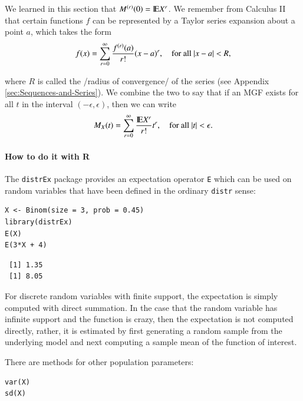 \documentclass[captions=tableheading]{scrbook}
\begin{document}
\begin{rem}
We learned in this section that \(M^{(r)}(0)=\mathrm{I\hspace{-1.5pt}E} X^{r}\). We remember from Calculus II that certain functions \(f\) can be represented by a Taylor series expansion about a point \(a\), which takes the form
\begin{equation}
f(x)=\sum_{r=0}^{\infty}\frac{f^{(r)}(a)}{r!}(x-a)^{r},\quad\mbox{for all \ensuremath{|x-a|<R},}
\end{equation}

where \(R\) is called the /radius of convergence/ of the series (see Appendix \ref{sec:Sequences-and-Series}). We combine the two to say that if an MGF exists for all \(t\) in the interval \((-\epsilon,\epsilon)\), then we can write
\begin{equation}
M_{X}(t)=\sum_{r=0}^{\infty}\frac{\mathrm{I\hspace{-1.5pt}E} X^{r}}{r!}t^{r},\quad\mbox{for all \ensuremath{|t|<\epsilon}.}
\end{equation}

\end{rem}

\paragraph*{How to do it with \textsf{R}}

The \texttt{distrEx} package provides an expectation operator \texttt{E} which can be used on random variables that have been defined in the ordinary \texttt{distr} sense:


\begin{verbatim}
X <- Binom(size = 3, prob = 0.45)
library(distrEx)
E(X)
E(3*X + 4)
\end{verbatim}

\begin{verbatim}
 [1] 1.35
 [1] 8.05
\end{verbatim}

For discrete random variables with finite support, the expectation is simply computed with direct summation. In the case that the random variable has infinite support and the function is crazy, then the expectation is not computed directly, rather, it is estimated by first generating a random sample from the underlying model and next computing a sample mean of the function of interest. 

There are methods for other population parameters:


\begin{verbatim}
var(X)
sd(X)
\end{verbatim}
\end{document}
